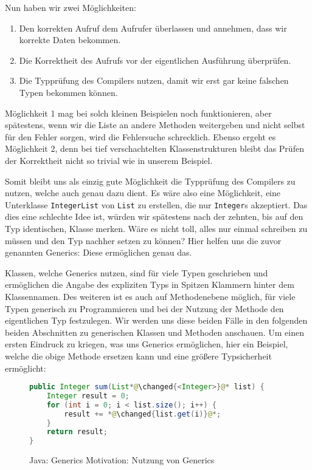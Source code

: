 		Nun haben wir zwei Möglichkeiten:
		\begin{enumerate}
			\item Den korrekten Aufruf dem Aufrufer überlassen und annehmen, dass wir korrekte Daten bekommen.
			\item Die Korrektheit des Aufrufs vor der eigentlichen Ausführung überprüfen.
			\item Die Typprüfung des Compilers nutzen, damit wir erst gar keine falschen Typen bekommen können.
		\end{enumerate}
		Möglichkeit 1 mag bei solch kleinen Beispielen noch funktionieren, aber spätestens, wenn wir die Liste an andere Methoden weitergeben und nicht selbst für den Fehler sorgen, wird die Fehlersuche schrecklich. Ebenso ergeht es Möglichkeit 2, denn bei tief verschachtelten Klassenstrukturen bleibt das Prüfen der Korrektheit nicht so trivial wie in unserem Beispiel.
		
		
		Somit bleibt uns als einzig gute Möglichkeit die Typprüfung des Compilers zu nutzen, welche auch genau dazu dient. Es wäre also eine Möglichkeit, eine Unterklasse \texttt{IntegerList} von \texttt{List} zu erstellen, die nur \texttt{Integer}s akzeptiert. Das dies eine schlechte Idee ist, würden wir spätestens nach der zehnten, bis auf den Typ identischen, Klasse merken. Wäre es nicht toll, alles nur einmal schreiben zu müssen und den Typ nachher setzen zu können? Hier helfen uns die zuvor genannten Generics: Diese ermöglichen genau das.
		
		Klassen, welche Generics nutzen, sind für viele Typen geschrieben und ermöglichen die Angabe des expliziten Typs in Spitzen Klammern hinter dem Klassennamen. Des weiteren ist es auch auf Methodenebene möglich, für viele Typen generisch zu Programmieren und bei der Nutzung der Methode den eigentlichen Typ festzulegen. Wir werden uns diese beiden Fälle in den folgenden beiden Abschnitten zu generischen Klassen und Methoden anschauen. Um einen ersten Eindruck zu kriegen, was uns Generics ermöglichen, hier ein Beispiel, welche die obige Methode ersetzen kann und eine größere Typsicherheit ermöglicht:
		\begin{figure}[H]
			\centering
			\begin{lstlisting}[language = Java]
public Integer sum(List*@\changed{<Integer>}@* list) {
	Integer result = 0;
	for (int i = 0; i < list.size(); i++) {
		result += *@\changed{list.get(i)}@*;
	}
	return result;
}
			\end{lstlisting}
			\caption{Java: Generics Motivation: Nutzung von Generics}
			\label{fig:java_generics_motivation_gen}
		\end{figure}
		
